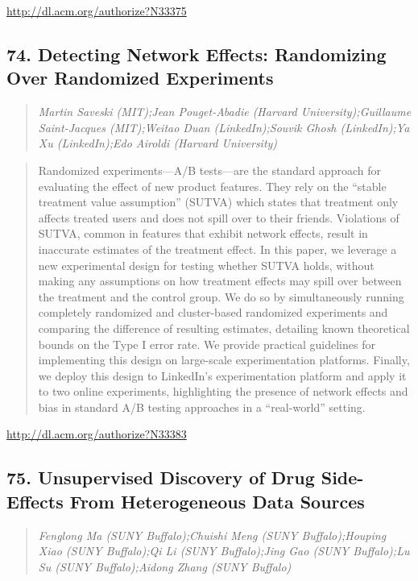 \documentclass{article}
\begin{document}
\href{http://dl.acm.org/authorize?N33375}{http://dl.acm.org/authorize?N33375}

\subsection{74. Detecting Network Effects: Randomizing Over Randomized Experiments}

\begin{quote}
\footnotesize{\textit{Martin Saveski (MIT);Jean Pouget-Abadie (Harvard University);Guillaume Saint-Jacques (MIT);Weitao Duan (LinkedIn);Souvik Ghosh (LinkedIn);Ya Xu (LinkedIn);Edo Airoldi (Harvard University)}}

\end{quote}

\begin{quote}
Randomized experiments—A/B tests—are the standard approach for evaluating the effect of new product features. They rely on the “stable treatment value assumption” (SUTVA) which states that treatment only affects treated users and does not spill over to their friends. Violations of SUTVA, common in features that exhibit network effects, result in inaccurate estimates of the treatment effect. In this paper, we leverage a new experimental design for testing whether SUTVA holds, without making any assumptions on how treatment effects may spill over between the treatment and the control group. We do so by simultaneously running completely randomized and cluster-based randomized experiments and comparing the difference of resulting estimates, detailing known theoretical bounds on the Type I error rate. We provide practical guidelines for implementing this design on large-scale experimentation platforms. Finally, we deploy this design to LinkedIn’s experimentation platform and apply it to two online experiments, highlighting the presence of network effects and bias in standard A/B testing approaches in a “real-world” setting.
\end{quote}

\href{http://dl.acm.org/authorize?N33383}{http://dl.acm.org/authorize?N33383}

\subsection{75. Unsupervised Discovery of Drug Side-Effects From Heterogeneous Data Sources}

\begin{quote}
\footnotesize{\textit{Fenglong Ma (SUNY Buffalo);Chuishi Meng (SUNY Buffalo);Houping Xiao (SUNY Buffalo);Qi Li (SUNY Buffalo);Jing Gao (SUNY Buffalo);Lu Su (SUNY Buffalo);Aidong Zhang (SUNY Buffalo)}}

\end{quote}
\end{document}
